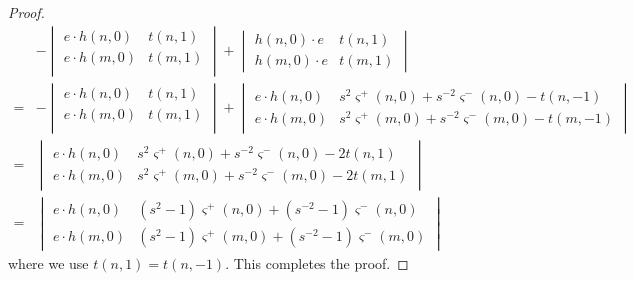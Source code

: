 \begin{proof}
\begin{align*}
&-
\begin{vmatrix}
e \cdot h(n, 0) & t(n, 1) \\
e \cdot h(m, 0) & t(m, 1) \\
\end{vmatrix}
+
\begin{vmatrix}
h(n, 0) \cdot e & t(n, 1) \\
h(m, 0) \cdot e & t(m, 1)
\end{vmatrix} \\
=& 
-
\begin{vmatrix}
e \cdot h(n, 0) & t(n, 1) \\
e \cdot h(m, 0) & t(m, 1) \\
\end{vmatrix}
+
\begin{vmatrix}
e \cdot h(n, 0) & s^2 \varsigma^+ (n, 0) + s^{-2} \varsigma^- (n, 0) - t(n, -1) \\
e \cdot h(m, 0) & s^2 \varsigma^+ (m, 0) + s^{-2} \varsigma^- (m, 0) - t(m, -1)
\end{vmatrix} \\
=& 
\begin{vmatrix}
e \cdot h(n, 0) & s^2 \varsigma^+ (n, 0) + s^{-2} \varsigma^- (n, 0) - 2 t(n, 1) \\
e \cdot h(m, 0) & s^2 \varsigma^+ (m, 0) + s^{-2} \varsigma^- (m, 0) - 2 t(m, 1)
\end{vmatrix} \\
=& 
\begin{vmatrix}
e \cdot h(n, 0) & (s^2 - 1) \varsigma^+ (n, 0) + (s^{-2} - 1) \varsigma^- (n, 0) \\
e \cdot h(m, 0) & (s^2 - 1) \varsigma^+ (m, 0) + (s^{-2} - 1) \varsigma^- (m, 0)
\end{vmatrix} 
\end{align*}
where we use $t(n, 1) = t(n, -1)$. This completes the proof. 
\end{proof}

